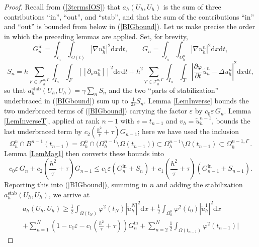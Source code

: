 \documentclass[11pt,a4paper]{article}
\theoremstyle{plain}
\theoremstyle{definition}
\theoremstyle{remark}
\numberwithin{equation}{section}
\newcommand{\dx}{\mathrm{d}x}
\newcommand{\dsigma}{\mathrm{d}\sigma}
\newcommand{\dt}{\mathrm{d}t}
\begin{document}
\begin{proof}
  Recall from (\ref{3termsIOS}) that $a_h (U_h, U_h)$ is the sum of three
  contributions ``in'', ``out'', and ``stab'', and that the sum of the contributions ``in''  and ``out'' is bounded from below in (\ref{BIGbound}).
  Let us make precise the order in which the preceding lemmas are applied. %
  Set, for brevity,
  \[ G_n^{\mathrm{in}} = \int_{I_n} \int_{\Omega (t)} | \nabla u^n_h |^2 \dx \dt , \qquad
     G_n = \int_{I_n} \int_{\Omega^n_h} | \nabla u^n_h |^2 \dx \dt , \]
  \[ S_n = h \sum_{F\in\mathcal{F}_h^{n, \Gamma}}\int_{I_n} \int_{F} [\![\partial_\nu u^n_h]\!]^2 \dsigma \dt
     + h^2 \sum_{T\in\mathcal{T}_h^{n,\Gamma}}\int_{I_n} \int_{T} \left| \frac{\partial \varphi}{\partial t}  \tilde{u}_h^n - \Delta u^n_h \right|^2 \dx \dt , \]
  so that $a_h^{\mathrm{stab}}(U_h,U_h)=\gamma\sum_n S_n$ and the two ``parts of stabilization'' underbraced in (\ref{BIGbound}) sum up to $\frac{1}{2\varepsilon}S_n$.
  Lemma \ref{LemInverse} bounds the two underbraced terms of (\ref{BIGbound}) carrying the factor $\varepsilon$ by $c_0\varepsilon\, G_n$. Lemma \ref{LemInverseT}, applied at rank $n-1$ with $s=t_{n-1}$ and $v_h=\tilde u_h^{n-1}$, bounds the last underbraced term by $c_2\left(\frac{h^2}{\tau}+\tau\right) G_{n-1}$; here we have used the inclusion
  \[ \Omega^n_h \cap B^{n - 1} (t_{n - 1}) = \Omega_h^n\cap\big(\Omega_h^{n-1}\setminus\Omega(t_{n-1})\big)
  \subset \Omega_h^{n-1}\setminus\Omega(t_{n-1})
  \subset \Omega_h^{n-1,\Gamma} \,.\]
Lemma \ref{LemMag1} then converts these bounds into
  \[ c_0\varepsilon\, G_n + c_2\left(\frac{h^2}{\tau}+\tau\right) G_{n-1} \leqslant c_1\varepsilon\left(G_n^{\mathrm{in}} + S_n\right) + c_1\left(\frac{h^2}{\tau}+\tau\right)\left(G_{n-1}^{\mathrm{in}} + S_{n-1}\right) . \]
  Reporting this into (\ref{BIGbound}), summing in $n$ and adding the stabilization $a_h^{\mathrm{stab}}(U_h,U_h)$, we arrive at
  \begin{multline*} a_h (U_h, U_h) \geqslant \frac{1}{2}  \int_{\Omega (t_N)} \varphi^2 (t_N) |
	\tilde{u}_h^N |^2 \dx + \frac{1}{2}  \int_{\Omega_h^0} \varphi^2 (t_0) |
	\tilde{u}_h^1 |^2 \dx \\
	+ \sum_{n = 1}^N \left( 1-c_1 \varepsilon - c_1 \left(\frac{h^2}{\tau}+\tau\right) \right) G_n^{\mathrm{in}} +
	\sum_{n = 2}^N \frac{1}{2}  \int_{\Omega (t_{n - 1})} \varphi^2 (t_{n - 1})  |

\end{multline*}
\end{proof}
\end{document}
